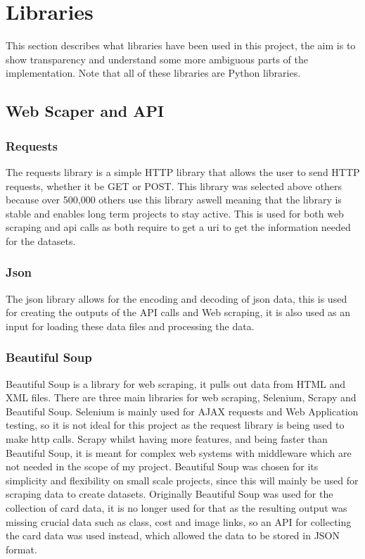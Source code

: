 \documentclass{report} %
\begin{document}
\section{Libraries}
This section describes what libraries have been used in this project, the aim is to show transparency and understand some more ambiguous parts of the implementation. Note that all of these libraries are Python libraries.
\subsection{Web Scaper and API}
\subsubsection{Requests}
The requests library is a simple HTTP library that allows the user to send HTTP requests, whether it be GET or POST. This library was selected above others because over 500,000 others use this library aswell meaning that the library is stable and enables long term projects to stay active. This is used for both web scraping and api calls as both require to get a uri to get the information needed for the datasets.
\subsubsection{Json}
The json library allows for the encoding and decoding of json data, this is used for creating the outputs of the API calls and Web scraping, it is also used as an input for loading these data files and processing the data.
\subsubsection{Beautiful Soup}
Beautiful Soup is a library for web scraping, it pulls out data from HTML and XML files. There are three main libraries for web scraping, Selenium,  Scrapy and Beautiful Soup. Selenium is mainly used for AJAX requests and Web Application testing, so it is not ideal for this project as the request library is being used to make http calls. Scrapy whilst having more features, and being faster than Beautiful Soup, it is meant for complex web systems with middleware which are not needed in the scope of my project. Beautiful Soup was chosen for its simplicity and flexibility on small scale projects, since this will mainly be used for scraping data to create datasets. Originally Beautiful Soup was used for the collection of card data, it is no longer used for that as the resulting output was missing crucial data such as class, cost and image links, so an API for collecting the card data was used instead, which allowed the data to be stored in JSON format. 
\end{document}
